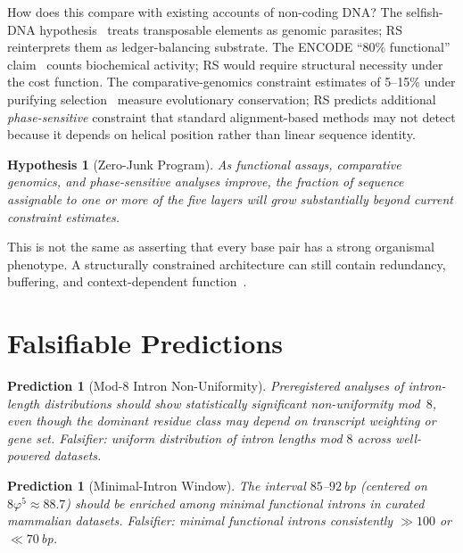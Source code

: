 \documentclass[11pt,a4paper]{article}
\newtheorem{hypothesis}[theorem]{Hypothesis}
\newtheorem{prediction}[theorem]{Prediction}
\newcommand{\ph}{\varphi}
\begin{document}
How does this compare with existing accounts of non-coding DNA? The selfish-DNA hypothesis~\cite{Orgel1980} treats transposable elements as genomic parasites; RS reinterprets them as ledger-balancing substrate. The ENCODE ``80\% functional'' claim~\cite{ENCODE2012} counts biochemical activity; RS would require structural necessity under the cost function. The comparative-genomics constraint estimates of 5--15\% under purifying selection~\cite{Ponting2011, Rands2014} measure evolutionary conservation; RS predicts additional \emph{phase-sensitive} constraint that standard alignment-based methods may not detect because it depends on helical position rather than linear sequence identity.

\begin{hypothesis}[Zero-Junk Program]
\label{hyp:zerojunk}
As functional assays, comparative genomics, and phase-sensitive analyses improve, the fraction of sequence assignable to one or more of the five layers will grow substantially beyond current constraint estimates.
\end{hypothesis}

This is not the same as asserting that every base pair has a strong organismal phenotype. A structurally constrained architecture can still contain redundancy, buffering, and context-dependent function~\cite{Kellis2014}.

\section{Falsifiable Predictions}
\label{sec:predictions}

\begin{prediction}[Mod-8 Intron Non-Uniformity]
\label{pred:mod8}
Preregistered analyses of intron-length distributions should show statistically significant non-uniformity mod~$8$, even though the dominant residue class may depend on transcript weighting or gene set. \emph{Falsifier}: uniform distribution of intron lengths mod $8$ across well-powered datasets.
\end{prediction}

\begin{prediction}[Minimal-Intron Window]
\label{pred:minintron}
The interval $85$--$92$\,bp (centered on $8\ph^5 \approx 88.7$) should be enriched among minimal functional introns in curated mammalian datasets. \emph{Falsifier}: minimal functional introns consistently $\gg 100$ or $\ll 70$\,bp.
\end{prediction}
\end{document}
